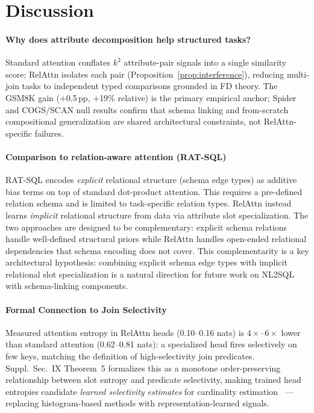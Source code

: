 \documentclass[conference]{IEEEtran}
\begin{document}
\section{Discussion}
\label{sec:discussion}

\paragraph{Why does attribute decomposition help structured tasks?}
Standard attention conflates $k^2$ attribute-pair signals into a single similarity score; RelAttn isolates each pair (Proposition~\ref{prop:interference}), reducing multi-join tasks to independent typed comparisons grounded in FD theory. The GSM8K gain ($+$0.5\,pp, $+$19\% relative) is the primary empirical anchor; Spider and COGS/SCAN null results confirm that schema linking and from-scratch compositional generalization are shared architectural constraints, not RelAttn-specific failures.

\paragraph{Comparison to relation-aware attention (RAT-SQL)}
RAT-SQL encodes \emph{explicit} relational structure (schema edge types) as additive bias terms on top of standard dot-product attention. This requires a pre-defined relation schema and is limited to task-specific relation types. RelAttn instead learns \emph{implicit} relational structure from data via attribute slot specialization. The two approaches are designed to be complementary: explicit schema relations handle well-defined structural priors while RelAttn handles open-ended relational dependencies that schema encoding does not cover. This complementarity is a key architectural hypothesis: combining explicit schema edge types with implicit relational slot specialization is a natural direction for future work on NL2SQL with schema-linking components.

\paragraph{Formal Connection to Join Selectivity}
Measured attention entropy in RelAttn heads (0.10--0.16 nats) is $4{\times}$--$6{\times}$ lower than standard attention (0.62--0.81 nats): a specialized head fires selectively on few keys, matching the definition of high-selectivity join predicates. Suppl.\ Sec.~IX Theorem~5 formalizes this as a monotone order-preserving relationship between slot entropy and predicate selectivity, making trained head entropies candidate \emph{learned selectivity estimates} for cardinality estimation~\cite{li2023alece,zeng2024price} --- replacing histogram-based methods with representation-learned signals.
\end{document}
